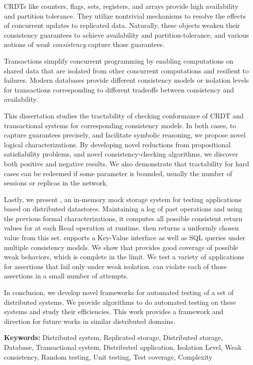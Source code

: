 CRDTs like counters, flags, sets, registers, and arrays provide high availability and partition tolerance. They utilize nontrivial mechanisms to resolve the effects of concurrent updates to replicated data. Naturally, these objects weaken their consistency guarantees to achieve availability and partition-tolerance, and various notions of \emph{weak consistency} capture those guarantees.

Transactions simplify concurrent programming by enabling computations on shared data that are isolated from other concurrent computations and resilient to failures. Modern databases provide different consistency models or isolation levels for transactions corresponding to different tradeoffs between consistency and availability.

This dissertation studies the tractability of checking conformance of CRDT and transactional systems for corresponding consistency models. In both cases, to capture guarantees precisely, and facilitate symbolic reasoning, we propose novel logical characterizations. By developing novel reductions from propositional satisfiability problems, and novel consistency-checking algorithms, we discover both positive and negative results. We also demonstrate that tractability for hard cases can be redeemed if some parameter is bounded, usually the number of sessions or replicas in the network.

Lastly, we present \tool{}, an in-memory mock storage system for testing applications based on distributed datastores. Maintaining a log of past operations and using the previous formal characterizations, it computes all possible consistent return values for at each \textrm{Read} operation at runtime. \tool{} then returns a uniformly chosen value from this set. \tool{} supports a Key-Value interface as well as SQL queries under multiple consistency models. We show that \tool{} provides good coverage of possible weak behaviors, which is complete in the limit. We test a variety of applications for assertions that fail only under weak isolation. \tool{} can violate each of those assertions in a small number of attempts.

In conclusion, we develop novel frameworks for automated testing of a set of distributed systems. We provide algorithms to do automated testing on these systems and study their efficiencies. This work provides a framework and direction for future works in similar distributed domains. 

\textbf{Keywords:} Distributed system, Replicated storage, Distributed storage, Database, Transactional system, Distributed application, Isolation Level, Weak consistency, Random testing, Unit testing, Test coverage, Complexity
